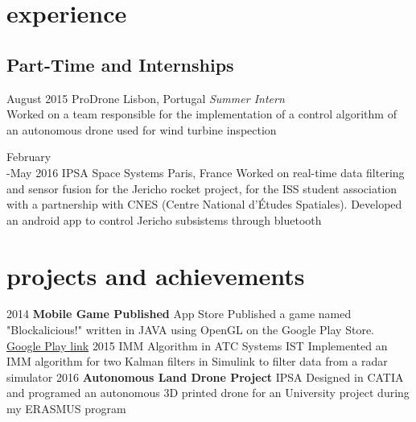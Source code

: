 \documentclass[]{friggeri-cv} %
\begin{document}

\section{experience}


\subsection{Part-Time and Internships}

\begin{entrylist}

\entry
{August 2015}
{ProDrone}
{Lisbon, Portugal}
{\emph{Summer Intern} \\
Worked on a team responsible for the implementation of a control algorithm of an autonomous drone used for wind turbine inspection}


\entry
{February\\-May 2016}
{IPSA Space Systems}
{Paris, France}
{Worked on real-time data filtering and sensor fusion for the Jericho rocket project, for the ISS student association with a partnership with CNES (Centre National d'Études Spatiales). Developed an android app to control Jericho subsistems through bluetooth}



\end{entrylist}


\section{projects and achievements}

\begin{entrylist}


\entry
{2014}
{\textbf{Mobile Game Published}}
{App Store}
{Published a game named "Blockalicious!" written in JAVA using OpenGL on the Google Play Store. 
\href{https://play.google.com/store/apps/details?id=com.guiero.blockaliciousfinal}{Google Play link}}
\entry
{2015}
{IMM Algorithm in ATC Systems}
{IST}
{Implemented an IMM algorithm for two Kalman filters in Simulink to filter data from a radar simulator}
\entry
{2016}
{\textbf{Autonomous Land Drone Project}}
{IPSA}
{Designed in CATIA and programed an autonomous 3D printed drone for an University project during my ERASMUS program}


\end{entrylist}
\end{document}
